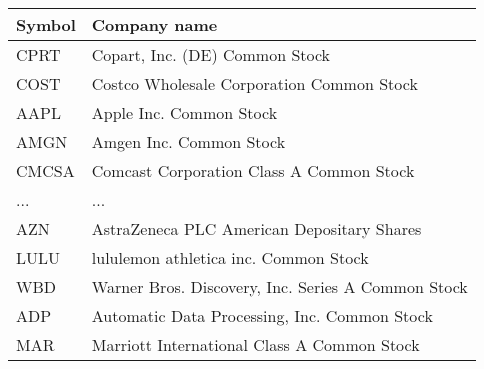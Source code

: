 \begin{tabular}{ll}
\toprule
Symbol & Company name \\
\midrule
CPRT & Copart, Inc. (DE) Common Stock \\
COST & Costco Wholesale Corporation Common Stock \\
AAPL & Apple Inc. Common Stock \\
AMGN & Amgen Inc. Common Stock \\
CMCSA & Comcast Corporation Class A Common Stock \\
... & ... \\
AZN & AstraZeneca PLC American Depositary Shares \\
LULU & lululemon athletica inc. Common Stock \\
WBD & Warner Bros. Discovery, Inc. Series A Common Stock  \\
ADP & Automatic Data Processing, Inc. Common Stock \\
MAR & Marriott International Class A Common Stock \\
\bottomrule
\end{tabular}
